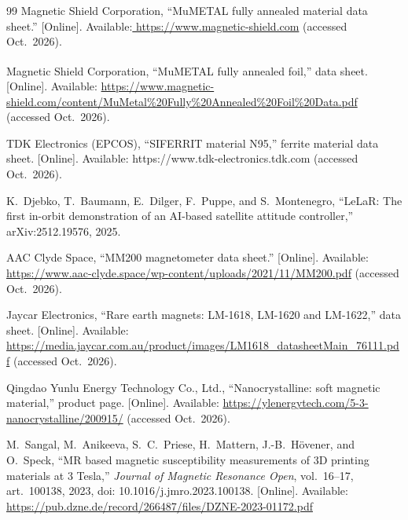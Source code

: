 \documentclass[12pt,a4paper]{article}
\begin{document}
\begin{thebibliography}{99}
Magnetic Shield Corporation, ``MuMETAL fully annealed material data sheet.'' [Online]. Available:\url{ https://www.magnetic-shield.com} (accessed Oct.\ 2026).

Magnetic Shield Corporation, ``MuMETAL\textsuperscript{\textregistered} fully annealed foil,'' data sheet. [Online]. Available: \url{https://www.magnetic-shield.com/content/MuMetal%20Fully%20Annealed%20Foil%20Data.pdf} (accessed Oct.\ 2026).

TDK Electronics (EPCOS), ``SIFERRIT material N95,'' ferrite material data sheet. [Online]. Available: https://www.tdk-electronics.tdk.com (accessed Oct.\ 2026).

K.\ Djebko, T.\ Baumann, E.\ Dilger, F.\ Puppe, and S.\ Montenegro, ``LeLaR: The first in-orbit demonstration of an AI-based satellite attitude controller,'' arXiv:2512.19576, 2025.

AAC Clyde Space, ``MM200 magnetometer data sheet.'' [Online]. Available:\url{ https://www.aac-clyde.space/wp-content/uploads/2021/11/MM200.pdf} (accessed Oct.\ 2026).

Jaycar Electronics, ``Rare earth magnets: LM-1618, LM-1620 and LM-1622,'' data sheet. [Online]. Available: \url{https://media.jaycar.com.au/product/images/LM1618_datasheetMain_76111.pdf} (accessed Oct.\ 2026).

Qingdao Yunlu Energy Technology Co., Ltd., ``Nanocrystalline: soft magnetic material,'' product page. [Online]. Available: \url{https://ylenergytech.com/5-3-nanocrystalline/200915/} (accessed Oct.\ 2026).

M.\ Sangal, M.\ Anikeeva, S.\ C.\ Priese, H.\ Mattern, J.-B.\ H\"ovener, and O.\ Speck, ``MR based magnetic susceptibility measurements of 3D printing materials at 3 Tesla,'' \emph{Journal of Magnetic Resonance Open}, vol.~16--17, art.~100138, 2023, doi: 10.1016/j.jmro.2023.100138. [Online]. Available: \url{https://pub.dzne.de/record/266487/files/DZNE-2023-01172.pdf}


\end{thebibliography}
\end{document}
